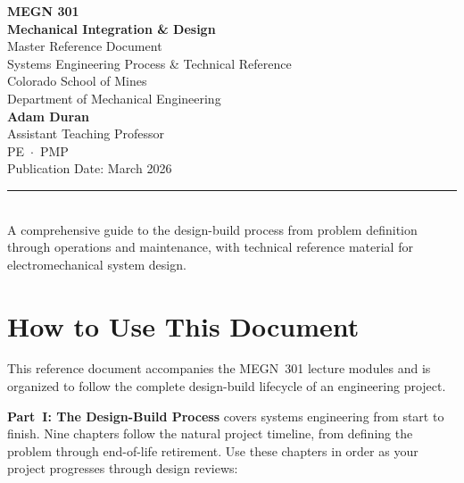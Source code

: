 \documentclass[11pt,letterpaper,twoside,openany]{book}
\begin{document}
\begin{titlepage}
\begin{center}
\vspace*{2cm}
{\Huge\bfseries\sffamily\textcolor{MinesBlue}{MEGN 301}}\\[0.5cm]
{\Huge\bfseries\sffamily\textcolor{MinesBlue}{Mechanical Integration \& Design}}\\[2cm]
{\huge\sffamily\textcolor{MinesBlue}{Master Reference Document}}\\[1cm]
{\Large\sffamily Systems Engineering Process \& Technical Reference}\\[3cm]
{\large\sffamily\textcolor{MinesSilver}{Colorado School of Mines}}\\[0.3cm]
{\large\sffamily\textcolor{MinesSilver}{Department of Mechanical Engineering}}\\[1.5cm]
{\Large\sffamily\textbf{Adam Duran}}\\[0.2cm]
{\normalsize\sffamily Assistant Teaching Professor}\\[0.2cm]
{\normalsize\sffamily\textcolor{MinesSilver}{PE \,$\cdot$\, PMP}}\\[1.5cm]
{\normalsize\sffamily\textcolor{MinesSilver}{Publication Date: March 2026}}\\[0.8cm]
\textcolor{MinesBlue}{\rule{0.6\textwidth}{1pt}}\\[0.5cm]
{\normalsize\sffamily A comprehensive guide to the design-build process from problem definition through operations and maintenance, with technical reference material for electromechanical system design.}
\end{center}
\end{titlepage}

\frontmatter
\tableofcontents
\newpage

\chapter*{How to Use This Document}

This reference document accompanies the MEGN~301 lecture modules and is organized to follow the complete design-build lifecycle of an engineering project.

\textbf{Part~I: The Design-Build Process} covers systems engineering from start to finish. Nine chapters follow the natural project timeline, from defining the problem through end-of-life retirement. Use these chapters in order as your project progresses through design reviews:
\end{document}
